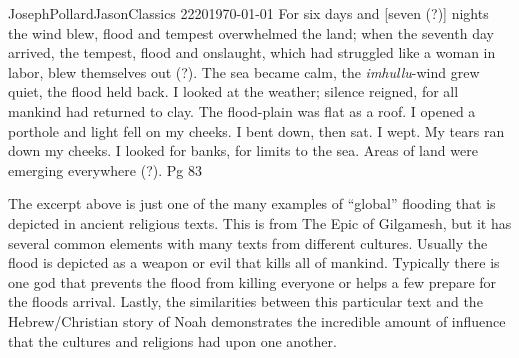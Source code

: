 \documentclass[12pt,letterpaper]{article}
\begin{document}
\begin{mla}{Joseph}{Pollard}{Jason}{Classics 2220}{\today}{}
For six days and [seven (?)] nights the wind blew, flood and tempest overwhelmed the land; when the seventh day arrived, the tempest, flood and onslaught, which had struggled like a woman in labor, blew themselves out (?). The sea became calm, the \emph{imhullu}-wind grew quiet, the flood held back. I looked at the weather; silence reigned, for all mankind had returned to clay. The flood-plain was flat as a roof. I opened a porthole and light fell on my cheeks. I bent down, then sat. I wept. My tears ran down my cheeks. I looked for banks, for limits to the sea. Areas of land were emerging everywhere (?). Pg 83

	The excerpt above is just one of the many examples of ``global'' flooding that is depicted in ancient religious texts. This is from The Epic of Gilgamesh, but it has several common elements with many texts from different cultures. Usually the flood is depicted as a weapon or evil that kills all of mankind. Typically there is one god that prevents the flood from killing everyone or helps a few prepare for the floods arrival. Lastly, the similarities between this particular text and the Hebrew/Christian story of Noah demonstrates the incredible amount of influence that the cultures and religions had upon one another.  
\end{mla}
\end{document}
